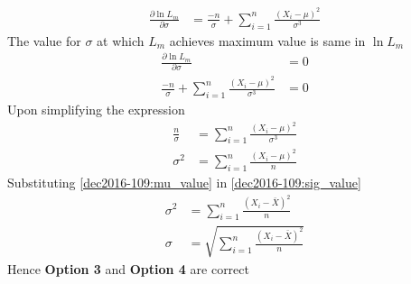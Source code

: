 \begin{align}
    \frac{\partial \ln{L_m}}{\partial \sigma} &= \frac{-n}{\sigma} + \sum_{i=1}^n\frac{(X_i - \mu)^2}{\sigma^3}
\end{align}
The value for $\sigma$ at which $L_m$ achieves maximum value is same in $\ln{L_m}$
\begin{align}
    \frac{\partial \ln{L_m}}{\partial \sigma} &= 0\\
    \frac{-n}{\sigma} + \sum_{i=1}^n\frac{(X_i - \mu)^2}{\sigma^3} &=0
\end{align}
Upon simplifying the expression
\begin{align}
\frac{n}{\sigma} &= \sum_{i=1}^n \frac{(X_i -\mu)^2}{\sigma^3}\\
{\sigma^2} &= \sum_{i=1}^n\frac{(X_i-\mu)^2}{n}\label{dec2016-109:sig_value}
\end{align}
Substituting \eqref{dec2016-109:mu_value} in \eqref{dec2016-109:sig_value}
\begin{align}
    {\sigma^2} &= \sum_{i=1}^n\frac{(X_i-\bar{X})^2}{n}\\
    {\sigma} &= \sqrt{\sum_{i=1}^n\frac{(X_i-\bar{X})^2}{n}}
\end{align}
Hence \textbf{Option 3} and \textbf{Option 4} are correct